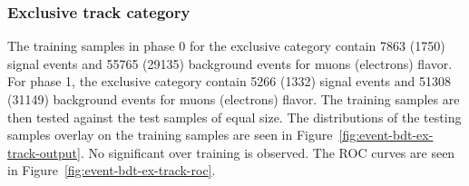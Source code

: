 \clearpage
\subsubsection{Exclusive track category}

The training samples in phase 0 for the exclusive  category contain 7863 (1750) signal events and 55765 (29135) background events for muons (electrons) flavor. For phase 1,  the exclusive  category contain 5266 (1332) signal events and 51308 (31149) background events for muons (electrons) flavor. The training samples are then tested against the test samples of equal size. The distributions of the testing samples overlay on the training samples are seen in Figure~\ref{fig:event-bdt-ex-track-output}. No significant over training is observed. The ROC curves are seen in Figure~\ref{fig:event-bdt-ex-track-roc}.

